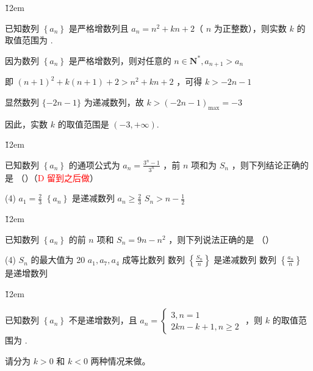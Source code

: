 \v{12em}

\begin{example}
    已知数列 $\left\{a_n\right\}$ 是严格增数列且 $a_n=n^2+k n+2$（ $n$ 为正整数），则实数 $k$ 的取值范围为 \underline{\qquad}.
\end{example}

\begin{solution}
    因为数列 $\left\{a_n\right\}$ 是严格增数列，则对任意的 $n \in \mathbf{N}^*, a_{n+1}>a_n$

    即 $(n+1)^2+k(n+1)+2>n^2+k n+2$ ，可得 $k>-2 n-1$

    显然数列 $\{-2 n-1\}$ 为递减数列，故 $k>(-2 n-1)_{\max }=-3$

    因此，实数 $k$ 的取值范围是 $(-3,+\infty)$.
\end{solution}

\v{12em}

\begin{example}
    已知数列 $\left\{a_n\right\}$ 的通项公式为 $a_n=\frac{3^n-1}{3^n}$ ，前 $n$ 项和为 $S_n$ ，则下列结论正确的是 （\qquad）（\textcolor{red}{D 留到之后做}）
    \begin{tasks}(4)
        \task $a_1=\frac{2}{3}$
        \task $\left\{a_n\right\}$ 是递减数列
        \task $a_n \geq \frac{2}{3}$
        \task $S_n>n-\frac{1}{2}$
    \end{tasks}
\end{example}

\v{12em}

\begin{example}
    已知数列 $\left\{a_n\right\}$ 的前 $n$ 项和 $S_n=9 n-n^2$ ，则下列说法正确的是 （\qquad）
    \begin{tasks}(4)
        \task $S_n$ 的最大值为 20
        \task $a_1, a_7, a_4$ 成等比数列
        \task 数列 $\left\{\frac{S_n}{n}\right\}$ 是递减数列
        \task 数列 $\left\{\frac{a_n}{n}\right\}$ 是递增数列
    \end{tasks}
\end{example}

\v{12em}

\begin{example}
    已知数列 $\left\{a_n\right\}$ 不是递增数列，且 $a_n=\left\{\begin{array}{l}3, n=1 \\ 2 k n-k+1, n \geq 2\end{array}\right.$ ，则 $k$ 的取值范围为  \underline{\qquad}.
\end{example}

\begin{tips}
    请分为 $k > 0$ 和 $k < 0$ 两种情况来做。
\end{tips}

